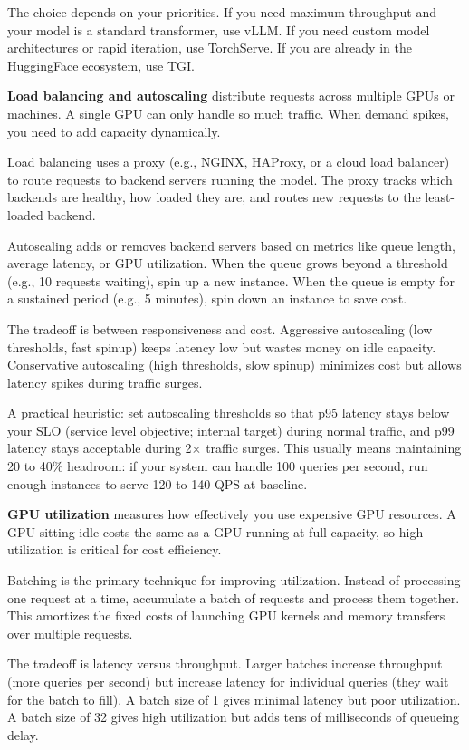 The choice depends on your priorities. If you need maximum throughput and your model is a standard transformer, use vLLM. If you need custom model architectures or rapid iteration, use TorchServe. If you are already in the HuggingFace ecosystem, use TGI.

\textbf{Load balancing and autoscaling} distribute requests across multiple GPUs or machines. A single GPU can only handle so much traffic. When demand spikes, you need to add capacity dynamically.

Load balancing uses a proxy (e.g., NGINX, HAProxy, or a cloud load balancer) to route requests to backend servers running the model. The proxy tracks which backends are healthy, how loaded they are, and routes new requests to the least-loaded backend.

Autoscaling adds or removes backend servers based on metrics like queue length, average latency, or GPU utilization. When the queue grows beyond a threshold (e.g., 10 requests waiting), spin up a new instance. When the queue is empty for a sustained period (e.g., 5 minutes), spin down an instance to save cost.

The tradeoff is between responsiveness and cost. Aggressive autoscaling (low thresholds, fast spinup) keeps latency low but wastes money on idle capacity. Conservative autoscaling (high thresholds, slow spinup) minimizes cost but allows latency spikes during traffic surges.

A practical heuristic: set autoscaling thresholds so that p95 latency stays below your SLO (service level objective; internal target) during normal traffic, and p99 latency stays acceptable during 2$\times$ traffic surges. This usually means maintaining 20 to 40\% headroom: if your system can handle 100 queries per second, run enough instances to serve 120 to 140 QPS at baseline.

\textbf{GPU utilization} measures how effectively you use expensive GPU resources. A GPU sitting idle costs the same as a GPU running at full capacity, so high utilization is critical for cost efficiency.

Batching is the primary technique for improving utilization. Instead of processing one request at a time, accumulate a batch of requests and process them together. This amortizes the fixed costs of launching GPU kernels and memory transfers over multiple requests.

The tradeoff is latency versus throughput. Larger batches increase throughput (more queries per second) but increase latency for individual queries (they wait for the batch to fill). A batch size of 1 gives minimal latency but poor utilization. A batch size of 32 gives high utilization but adds tens of milliseconds of queueing delay.

